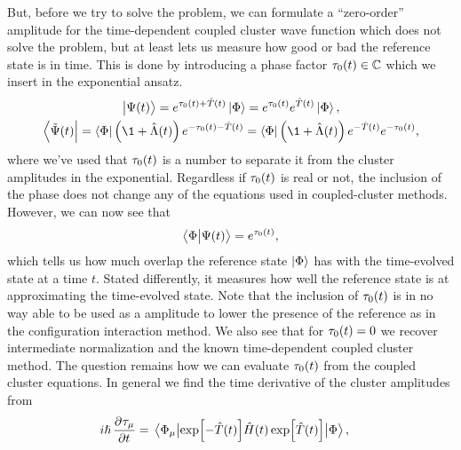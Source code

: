             But, before we try to solve the problem, we can formulate a
            ``zero-order'' amplitude for the time-dependent coupled cluster wave
            function which does not solve the problem, but at least lets us
            measure how good or bad the reference state is in time.
            This is done by introducing a phase factor $\tau_0(t) \in
            \mathbb{C}$ which we insert in the exponential ansatz.
            \begin{gather}
                \ket{\Psi(t)}
                = e^{\clustamp_0(t) + \clust(t)}\ket{\slat}
                = e^{\clustamp_0(t)} e^{\clust(t)}\ket{\slat},
                \\
                \bra{\tilde{\Psi}(t)}
                = \bra{\slat}\para{\1 + \clustl(t)}
                e^{-\clustamp_0(t) - \clust(t)}
                = \bra{\slat}\para{\1 + \clustl(t)}
                e^{-\clust(t)} e^{-\clustamp_0(t)},
            \end{gather}
            where we've used that $\tau_0(t)$ is a number to separate it
            from the cluster amplitudes in the exponential.
            Regardless if $\tau_0(t)$ is real or not, the inclusion of the
            phase does not change any of the equations used in coupled-cluster
            methods.
            However, we can now see that
            \begin{align}
                \braket{\Phi}{\Psi(t)} = e^{\tau_0(t)},
            \end{align}
            which tells us how much overlap the reference state $\ket{\Phi}$ has
            with the time-evolved state at a time $t$.
            Stated differently, it measures how well the reference state
            is at approximating the time-evolved state.
            Note that the inclusion of $\tau_0(t)$ is in no way able to be
            used as a amplitude to lower the presence of the reference as in the
            configuration interaction method.
            We also see that for $\tau_0(t) = 0$ we recover intermediate
            normalization and the known time-dependent coupled cluster method.
            The question remains how we can evaluate $\tau_0(t)$ from the
            coupled cluster equations.
            In general we find the time derivative of the cluster amplitudes
            from
            \begin{align}
                i\hslash \dpd{\clustamp_{\mu}}{t}
                &=
                \mel{\slat_{\mu}}{
                    \exp[-\clust(t)]
                    \hamil(t)
                    \exp[\clust(t)]
                }{\slat},
            \end{align}
